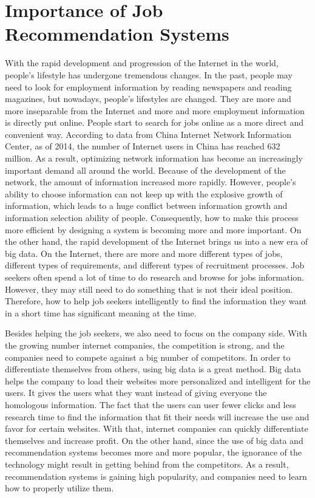 \documentclass[sigconf]{acmart}
\begin{document}
\section{Importance of Job Recommendation Systems}
With the rapid development and progression of the Internet in the world, people's lifestyle has undergone tremendous changes. In the past, people may need to look for employment information by reading newspapers and reading magazines, but nowadays, people's lifestyles are changed. They are more and more inseparable from the Internet and more and more employment information is directly put online. People start to search for jobs online as a more direct and convenient way. According to data from China Internet Network Information Center, as of 2014, the number of Internet users in China has reached 632 million.\cite{Zhou2017} As a result, optimizing network information has become an increasingly important demand all around the world. Because of the development of the network, the amount of information increased more rapidly. However, people's ability to choose information can not keep up with the explosive growth of information, which leads to a huge conflict between information growth and information selection ability of people. Consequently, how to make this process more efficient by designing a system is becoming more and more important. On the other hand, the rapid development of the Internet brings us into a new era of big data. On the Internet, there are more and more different types of jobs, different types of requirements, and different types of recruitment processes. Job seekers often spend a lot of time to do research and browse for jobs information. However, they may still need to do something that is not their ideal position. Therefore, how to help job seekers intelligently to find the information they want in a short time has significant meaning at the time.

\par Besides helping the job seekers, we also need to focus on the company side. With the growing number internet companies, the competition is strong, and the companies need to compete against a big number of competitors. In order to differentiate themselves from others, using big data is a great method. Big data helps the company to load their websites more personalized and intelligent for the users. It gives the users what they want instead of giving everyone the homologous information. The fact that the users can user fewer clicks and less research time to find the information that fit their needs will increase the use and favor for certain websites. With that, internet companies can quickly differentiate themselves and increase profit. On the other hand, since the use of big data and recommendation systems becomes more and more popular, the ignorance of the technology might result in getting behind from the competitors. As a result, recommendation systems is gaining high popularity, and companies need to learn how to properly utilize them.
\end{document}
